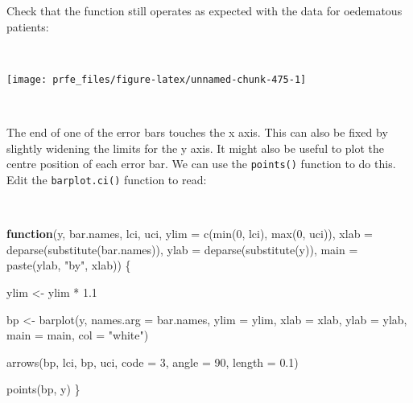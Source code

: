 \documentclass[
  12pt,
  a4paper]{book}
\newenvironment{Shaded}{\begin{snugshade}}{\end{snugshade}}
\newcommand{\AttributeTok}[1]{\textcolor[rgb]{0.77,0.63,0.00}{#1}}
\newcommand{\ControlFlowTok}[1]{\textcolor[rgb]{0.13,0.29,0.53}{\textbf{#1}}}
\newcommand{\DecValTok}[1]{\textcolor[rgb]{0.00,0.00,0.81}{#1}}
\newcommand{\FloatTok}[1]{\textcolor[rgb]{0.00,0.00,0.81}{#1}}
\newcommand{\FunctionTok}[1]{\textcolor[rgb]{0.00,0.00,0.00}{#1}}
\newcommand{\NormalTok}[1]{#1}
\newcommand{\OtherTok}[1]{\textcolor[rgb]{0.56,0.35,0.01}{#1}}
\newcommand{\SpecialCharTok}[1]{\textcolor[rgb]{0.00,0.00,0.00}{#1}}
\newcommand{\StringTok}[1]{\textcolor[rgb]{0.31,0.60,0.02}{#1}}
\begin{document}
Check that the function still operates as expected with the data for oedematous patients:

~

\begin{Shaded}
\end{Shaded}

\begin{center}\texttt{[image: prfe\_files/figure-latex/unnamed-chunk-475-1]} \end{center}

~

The end of one of the error bars touches the x axis. This can also be fixed by slightly widening the limits for the y axis. It might also be useful to plot the centre position of each error bar. We can use the \texttt{points()} function to do this. Edit the \texttt{barplot.ci()} function to read:

~

\begin{Shaded}
\begin{Highlighting}[]
\ControlFlowTok{function}\NormalTok{(y, bar.names, lci, uci,}
         \AttributeTok{ylim =} \FunctionTok{c}\NormalTok{(}\FunctionTok{min}\NormalTok{(}\DecValTok{0}\NormalTok{, lci), }\FunctionTok{max}\NormalTok{(}\DecValTok{0}\NormalTok{, uci)),}
         \AttributeTok{xlab =} \FunctionTok{deparse}\NormalTok{(}\FunctionTok{substitute}\NormalTok{(bar.names)),}
         \AttributeTok{ylab =} \FunctionTok{deparse}\NormalTok{(}\FunctionTok{substitute}\NormalTok{(y)),}
         \AttributeTok{main =} \FunctionTok{paste}\NormalTok{(ylab, }\StringTok{"by"}\NormalTok{, xlab)) \{}
     
\NormalTok{  ylim }\OtherTok{\textless{}{-}}\NormalTok{ ylim }\SpecialCharTok{*} \FloatTok{1.1}
     
\NormalTok{  bp }\OtherTok{\textless{}{-}} \FunctionTok{barplot}\NormalTok{(y, }\AttributeTok{names.arg =}\NormalTok{ bar.names, }\AttributeTok{ylim =}\NormalTok{ ylim, }\AttributeTok{xlab =}\NormalTok{ xlab,}
                \AttributeTok{ylab =}\NormalTok{ ylab, }\AttributeTok{main =}\NormalTok{ main, }\AttributeTok{col =} \StringTok{"white"}\NormalTok{)}
     
  \FunctionTok{arrows}\NormalTok{(bp, lci, bp, uci, }\AttributeTok{code =} \DecValTok{3}\NormalTok{, }\AttributeTok{angle =} \DecValTok{90}\NormalTok{, }\AttributeTok{length =} \FloatTok{0.1}\NormalTok{)}
     
  \FunctionTok{points}\NormalTok{(bp, y)}
\NormalTok{\}}
\end{Highlighting}
\end{Shaded}
\end{document}
